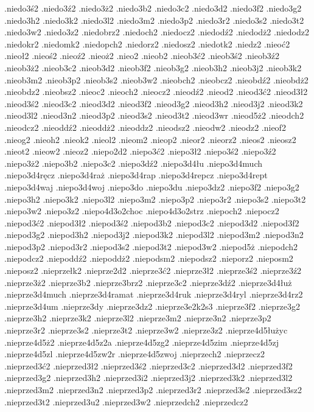 {.niedo3ś2
.niedo3ź2
.niedo3ż2
.niedo3b2
.niedo3c2
.niedo3d2
.niedo3f2
.niedo3g2
.niedo3h2
.niedo3k2
.niedo3l2
.niedo3m2
.niedo3p2
.niedo3r2
.niedo3s2
.niedo3t2
.niedo3w2
.niedo3z2
.niedobrz2
.niedoch2
.niedocz2
.niedodź2
.niedodż2
.niedodz2
.niedokr2
.niedomk2
.niedopch2
.niedorz2
.niedosz2
.niedotk2
.niedz2
.nieoć2
.nieoł2
.nieoś2
.nieoź2
.nieoż2
.nieo2
.nieob2
.nieob3ć2
.nieob3ś2
.nieob3ź2
.nieob3ż2
.nieob3c2
.nieob3d2
.nieob3f2
.nieob3g2
.nieob3h2
.nieob3j2
.nieob3k2
.nieob3m2
.nieob3p2
.nieob3s2
.nieob3w2
.nieobch2
.nieobcz2
.nieobdź2
.nieobdż2
.nieobdz2
.nieobsz2
.nieoc2
.nieoch2
.nieocz2
.nieodź2
.nieod2
.nieod3ć2
.nieod3ł2
.nieod3ś2
.nieod3c2
.nieod3d2
.nieod3f2
.nieod3g2
.nieod3h2
.nieod3j2
.nieod3k2
.nieod3l2
.nieod3n2
.nieod3p2
.nieod3s2
.nieod3t2
.nieod3wr
.nieod5ż2
.nieodch2
.nieodcz2
.nieoddź2
.nieoddż2
.nieoddz2
.nieodsz2
.nieodw2
.nieodz2
.nieof2
.nieog2
.nieoh2
.nieok2
.nieol2
.nieom2
.nieop2
.nieor2
.nieorz2
.nieos2
.nieosz2
.nieot2
.nieow2
.nieoz2
.niepo2d2
.niepo3ć2
.niepo3ł2
.niepo3ś2
.niepo3ź2
.niepo3ż2
.niepo3b2
.niepo3c2
.niepo3dź2
.niepo3d4łu
.niepo3d4much
.niepo3d4ręcz
.niepo3d4raż
.niepo3d4rap
.niepo3d4repcz
.niepo3d4rept
.niepo3d4waj
.niepo3d4woj
.niepo3do
.niepo3du
.niepo3dz2
.niepo3f2
.niepo3g2
.niepo3h2
.niepo3k2
.niepo3l2
.niepo3m2
.niepo3p2
.niepo3r2
.niepo3s2
.niepo3t2
.niepo3w2
.niepo3z2
.niepo4d3o2choc
.niepo4d3o2strz
.niepoch2
.niepocz2
.niepod3ć2
.niepod3ł2
.niepod3ś2
.niepod3b2
.niepod3c2
.niepod3d2
.niepod3f2
.niepod3g2
.niepod3h2
.niepod3j2
.niepod3k2
.niepod3l2
.niepod3m2
.niepod3n2
.niepod3p2
.niepod3r2
.niepod3s2
.niepod3t2
.niepod3w2
.niepod5ż
.niepodch2
.niepodcz2
.niepoddź2
.niepoddż2
.niepodsm2
.niepodsz2
.nieporz2
.nieposm2
.nieposz2
.nieprzełk2
.nieprze2d2
.nieprze3ć2
.nieprze3ł2
.nieprze3ś2
.nieprze3ź2
.nieprze3ż2
.nieprze3b2
.nieprze3brz2
.nieprze3c2
.nieprze3dź2
.nieprze3d4łuż
.nieprze3d4much
.nieprze3d4ramat
.nieprze3d4ruk
.nieprze3d4ryl
.nieprze3d4rz2
.nieprze3d4um
.nieprze3dy
.nieprze3dz2
.nieprze3e2k2s3
.nieprze3f2
.nieprze3g2
.nieprze3h2
.nieprze3k2
.nieprze3l2
.nieprze3m2
.nieprze3n2
.nieprze3p2
.nieprze3r2
.nieprze3s2
.nieprze3t2
.nieprze3w2
.nieprze3z2
.nieprze4d5łużyc
.nieprze4d5ż2
.nieprze4d5z2a
.nieprze4d5zg2
.nieprze4d5zim
.nieprze4d5zj
.nieprze4d5zl
.nieprze4d5zw2r
.nieprze4d5zwoj
.nieprzech2
.nieprzecz2
.nieprzed3ć2
.nieprzed3ł2
.nieprzed3ś2
.nieprzed3c2
.nieprzed3d2
.nieprzed3f2
.nieprzed3g2
.nieprzed3h2
.nieprzed3i2
.nieprzed3j2
.nieprzed3k2
.nieprzed3l2
.nieprzed3m2
.nieprzed3n2
.nieprzed3p2
.nieprzed3r2
.nieprzed3s2
.nieprzed3sz2
.nieprzed3t2
.nieprzed3u2
.nieprzed3w2
.nieprzedch2
.nieprzedcz2
}
